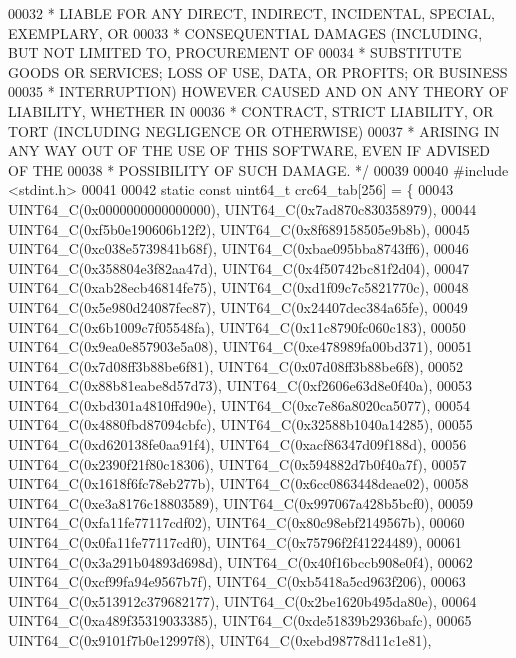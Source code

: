 \begin{DoxyCode}
00032 \textcolor{comment}{ * LIABLE FOR ANY DIRECT, INDIRECT, INCIDENTAL, SPECIAL, EXEMPLARY, OR}
00033 \textcolor{comment}{ * CONSEQUENTIAL DAMAGES (INCLUDING, BUT NOT LIMITED TO, PROCUREMENT OF}
00034 \textcolor{comment}{ * SUBSTITUTE GOODS OR SERVICES; LOSS OF USE, DATA, OR PROFITS; OR BUSINESS}
00035 \textcolor{comment}{ * INTERRUPTION) HOWEVER CAUSED AND ON ANY THEORY OF LIABILITY, WHETHER IN}
00036 \textcolor{comment}{ * CONTRACT, STRICT LIABILITY, OR TORT (INCLUDING NEGLIGENCE OR OTHERWISE)}
00037 \textcolor{comment}{ * ARISING IN ANY WAY OUT OF THE USE OF THIS SOFTWARE, EVEN IF ADVISED OF THE}
00038 \textcolor{comment}{ * POSSIBILITY OF SUCH DAMAGE. */}
00039 
00040 \textcolor{preprocessor}{#}\textcolor{preprocessor}{include} \textcolor{preprocessor}{<}\textcolor{preprocessor}{stdint}\textcolor{preprocessor}{.}\textcolor{preprocessor}{h}\textcolor{preprocessor}{>}
00041 
00042 \textcolor{keyword}{static} \textcolor{keyword}{const} uint64\_t crc64\_tab[256] = \{
00043     UINT64\_C(0x0000000000000000), UINT64\_C(0x7ad870c830358979),
00044     UINT64\_C(0xf5b0e190606b12f2), UINT64\_C(0x8f689158505e9b8b),
00045     UINT64\_C(0xc038e5739841b68f), UINT64\_C(0xbae095bba8743ff6),
00046     UINT64\_C(0x358804e3f82aa47d), UINT64\_C(0x4f50742bc81f2d04),
00047     UINT64\_C(0xab28ecb46814fe75), UINT64\_C(0xd1f09c7c5821770c),
00048     UINT64\_C(0x5e980d24087fec87), UINT64\_C(0x24407dec384a65fe),
00049     UINT64\_C(0x6b1009c7f05548fa), UINT64\_C(0x11c8790fc060c183),
00050     UINT64\_C(0x9ea0e857903e5a08), UINT64\_C(0xe478989fa00bd371),
00051     UINT64\_C(0x7d08ff3b88be6f81), UINT64\_C(0x07d08ff3b88be6f8),
00052     UINT64\_C(0x88b81eabe8d57d73), UINT64\_C(0xf2606e63d8e0f40a),
00053     UINT64\_C(0xbd301a4810ffd90e), UINT64\_C(0xc7e86a8020ca5077),
00054     UINT64\_C(0x4880fbd87094cbfc), UINT64\_C(0x32588b1040a14285),
00055     UINT64\_C(0xd620138fe0aa91f4), UINT64\_C(0xacf86347d09f188d),
00056     UINT64\_C(0x2390f21f80c18306), UINT64\_C(0x594882d7b0f40a7f),
00057     UINT64\_C(0x1618f6fc78eb277b), UINT64\_C(0x6cc0863448deae02),
00058     UINT64\_C(0xe3a8176c18803589), UINT64\_C(0x997067a428b5bcf0),
00059     UINT64\_C(0xfa11fe77117cdf02), UINT64\_C(0x80c98ebf2149567b),
00060     UINT64\_C(0x0fa11fe77117cdf0), UINT64\_C(0x75796f2f41224489),
00061     UINT64\_C(0x3a291b04893d698d), UINT64\_C(0x40f16bccb908e0f4),
00062     UINT64\_C(0xcf99fa94e9567b7f), UINT64\_C(0xb5418a5cd963f206),
00063     UINT64\_C(0x513912c379682177), UINT64\_C(0x2be1620b495da80e),
00064     UINT64\_C(0xa489f35319033385), UINT64\_C(0xde51839b2936bafc),
00065     UINT64\_C(0x9101f7b0e12997f8), UINT64\_C(0xebd98778d11c1e81),

\end{DoxyCode}
